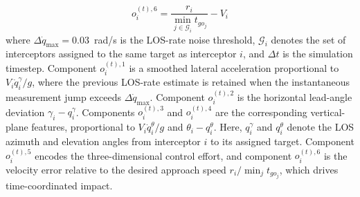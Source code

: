 \documentclass[lettersize,journal]{IEEEtran}
\begin{document}
\begin{equation}
\label{eq:o6}
o_i^{(t),6}
=
\frac{r_i}{\min_{j\in\mathcal{G}_i}t_{go_j}}-V_i
\end{equation}
where $\Delta\dot{q}_{\max}=0.03$~rad/s is the LOS-rate noise threshold, $\mathcal{G}_i$ denotes the set of interceptors assigned to the same target as interceptor $i$, and $\Delta t$ is the simulation timestep. 
Component $o_i^{(t),1}$ is a smoothed lateral acceleration proportional to $V_i\dot q_i^{\gamma}/g$, where the previous LOS-rate estimate is retained when the instantaneous measurement jump exceeds $\Delta\dot q_{\max}$.
Component $o_i^{(t),2}$ is the horizontal lead-angle deviation $\gamma_i-q_i^{\gamma}$.
Components $o_i^{(t),3}$ and $o_i^{(t),4}$ are the corresponding vertical-plane features, proportional to $V_i\dot q_i^{\theta}/g$ and $\theta_i-q_i^{\theta}$. Here, $q_i^{\gamma}$ and $q_i^{\theta}$ denote the LOS azimuth and elevation angles from interceptor $i$ to its assigned target.
Component $o_i^{(t),5}$ encodes the three-dimensional control effort, and component $o_i^{(t),6}$ is the velocity error relative to the desired approach speed $r_i/\min_j t_{go_j}$, which drives time-coordinated impact.
\end{document}
